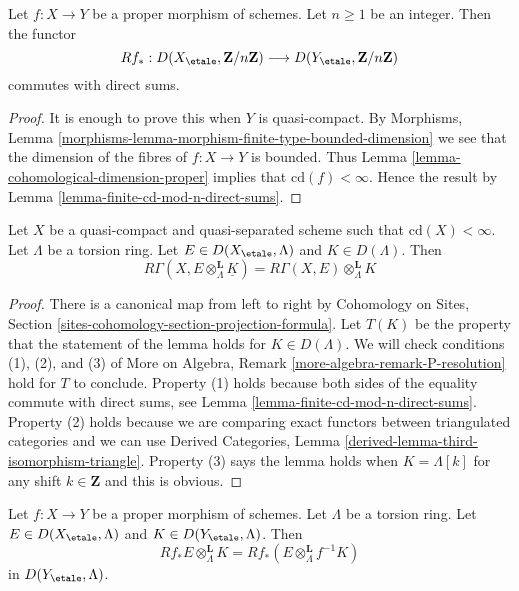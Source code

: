 \begin{lemma}
\label{lemma-proper-mod-n-direct-sums}
Let $f : X \to Y$ be a proper morphism of schemes. Let $n \geq 1$
be an integer. Then the functor
$$
Rf_* :
D(X_\etale, \mathbf{Z}/n\mathbf{Z})
\longrightarrow
D(Y_\etale, \mathbf{Z}/n\mathbf{Z})
$$
commutes with direct sums.
\end{lemma}

\begin{proof}
It is enough to prove this when $Y$ is quasi-compact. By
Morphisms, Lemma \ref{morphisms-lemma-morphism-finite-type-bounded-dimension}
we see that the dimension of the fibres of
$f : X \to Y$ is bounded.
Thus Lemma \ref{lemma-cohomological-dimension-proper}
implies that $\text{cd}(f) < \infty$. Hence the
result by Lemma \ref{lemma-finite-cd-mod-n-direct-sums}.
\end{proof}

\begin{lemma}
\label{lemma-pull-out-constant-mod-n}
Let $X$ be a quasi-compact and quasi-separated scheme
such that $\text{cd}(X) < \infty$. Let $\Lambda$ be a torsion ring.
Let $E \in D(X_\etale, \Lambda)$ and $K \in D(\Lambda)$. Then
$$
R\Gamma(X, E \otimes_\Lambda^\mathbf{L} \underline{K}) =
R\Gamma(X, E) \otimes_\Lambda^\mathbf{L} K
$$
\end{lemma}

\begin{proof}
There is a canonical map from left to right by
Cohomology on Sites, Section \ref{sites-cohomology-section-projection-formula}.
Let $T(K)$ be the property that the statement of the
lemma holds for $K \in D(\Lambda)$.
We will check conditions (1), (2), and (3) of
More on Algebra, Remark \ref{more-algebra-remark-P-resolution}
hold for $T$ to conclude.
Property (1) holds because both sides of the equality
commute with direct sums, see
Lemma \ref{lemma-finite-cd-mod-n-direct-sums}.
Property (2) holds because we are comparing exact functors
between triangulated categories and we can use
Derived Categories, Lemma \ref{derived-lemma-third-isomorphism-triangle}.
Property (3) says the lemma holds when $K = \Lambda[k]$
for any shift $k \in \mathbf{Z}$ and this is obvious.
\end{proof}

\begin{lemma}
\label{lemma-projection-formula-proper-mod-n}
Let $f : X \to Y$ be a proper morphism of schemes. Let $\Lambda$
be a torsion ring. Let $E \in D(X_\etale, \Lambda)$ and
$K \in D(Y_\etale, \Lambda)$. Then
$$
Rf_*E \otimes_\Lambda^\mathbf{L} K =
Rf_*(E \otimes_\Lambda^\mathbf{L} f^{-1}K)
$$
in $D(Y_\etale, \Lambda)$.
\end{lemma}

